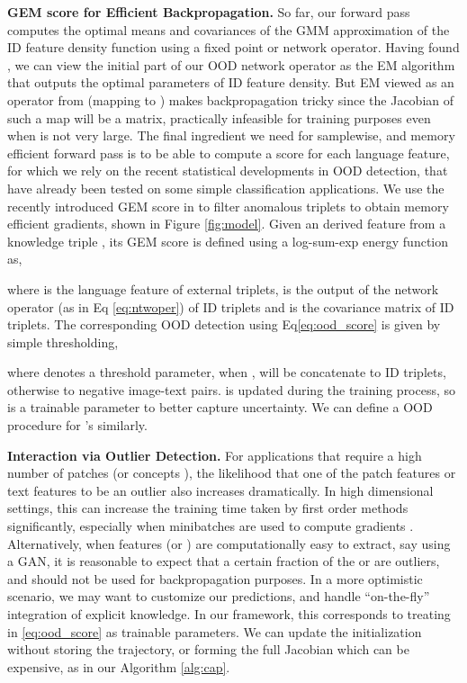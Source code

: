 \documentclass{article}
\begin{document}
\setlength{\textfloatsep}{5pt}

{\bf GEM score for Efficient Backpropagation.} So far, our forward pass computes the optimal means  and covariances  of the GMM approximation of the ID feature density function using a fixed point or network operator.  Having found , we can view the initial part of our OOD network operator  as the EM algorithm that outputs the optimal parameters of ID feature density. But EM viewed as an operator from  (mapping  to ) makes backpropagation tricky since the Jacobian of such a map will be a  matrix, practically infeasible for training purposes even when  is not very large.   The final ingredient we need for samplewise, and memory efficient forward pass is to be able to compute a score for each   language feature, for which we rely on the recent statistical developments in OOD detection, that have already been tested on some simple classification applications. We use the recently introduced GEM score in \cite{morteza2022provable} to filter anomalous triplets to obtain memory efficient gradients, shown in Figure \ref{fig:model}.   Given an derived feature from a knowledge triple , its GEM score is defined using a log-sum-exp energy function as,

where  is the language feature of external triplets,  is the output of the network operator  (as in Eq \eqref{eq:ntwoper}) of ID triplets  and  is the covariance matrix of ID triplets. The corresponding OOD detection  using Eq\ref{eq:ood_score} is given by simple thresholding,

where  denotes a threshold parameter, when ,  will be concatenate to ID triplets, otherwise to negative image-text pairs.  is updated during the training process, so  is a trainable parameter to better capture uncertainty.  { We can define a OOD procedure for 's similarly.}



\textbf{Interaction via Outlier Detection.} For applications that require a high number of patches  (or concepts ),  the likelihood that one of the patch features or text features to be an outlier also increases dramatically. In high dimensional settings, this can increase the training time taken by first order methods significantly, especially when minibatches are used to compute gradients \cite{geiping2021stochastic}. Alternatively, when features  (or ) are computationally easy to extract, say using a GAN, it is reasonable to expect that a certain fraction of the  or  are outliers, and should not be used for backpropagation purposes. In a more optimistic scenario, we may want to customize our predictions, and handle ``on-the-fly'' integration of explicit knowledge.  In our framework, this corresponds to treating   in \eqref{eq:ood_score} as trainable parameters. We can update the initialization  without storing the trajectory, or forming the full Jacobian which can be expensive, as in our Algorithm \ref{alg:cap}.
\end{document}
